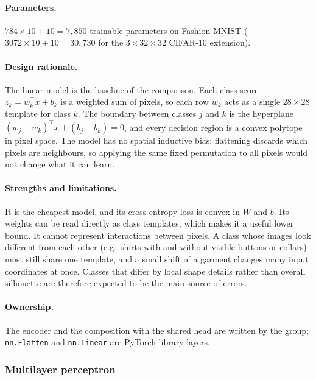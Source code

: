 \paragraph{Parameters.} $784\times10+10=7{,}850$ trainable parameters on
Fashion-MNIST ($3072\times10+10=30{,}730$ for the $3\times32\times32$ CIFAR-10
extension).

\paragraph{Design rationale.} The linear model is the baseline of the
comparison. Each class score $z_k=w_k^\top x+b_k$ is a weighted sum of pixels,
so each row $w_k$ acts as a single $28\times28$ template for class $k$. The
boundary between classes $j$ and $k$ is the hyperplane
$(w_j-w_k)^\top x+(b_j-b_k)=0$, and every decision region is a convex polytope
in pixel space. The model has no spatial inductive bias: flattening discards
which pixels are neighbours, so applying the same fixed permutation to all
pixels would not change what it can learn.

\paragraph{Strengths and limitations.} It is the cheapest model, and its
cross-entropy loss is convex in $W$ and $b$. Its weights can be read directly as
class templates, which makes it a useful lower bound. It cannot represent
interactions between pixels. A class whose images look different from each
other (e.g.\ shirts with and without visible buttons or collars) must still
share one template, and a small shift of a garment changes many input
coordinates at once. Classes that differ by local shape details rather than
overall silhouette are therefore expected to be the main source of errors.

\paragraph{Ownership.} The encoder and the composition with the shared head are
written by the group; \texttt{nn.Flatten} and \texttt{nn.Linear} are PyTorch
library layers.

\subsubsection{Multilayer perceptron}

